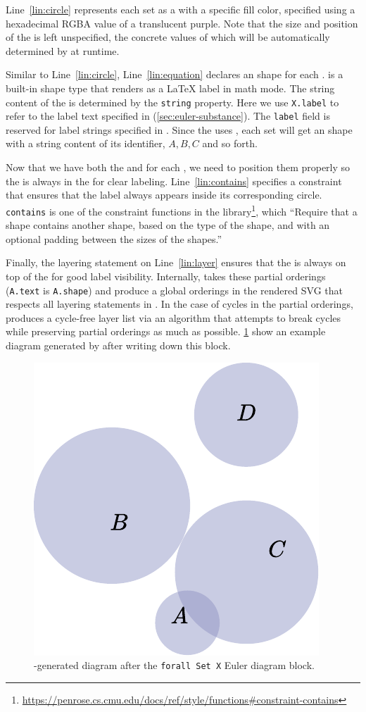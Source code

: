 Line~\ref{lin:circle} represents each set as a  with a specific fill color, specified using a hexadecimal RGBA value of a translucent purple. Note that the size and position of the  is left unspecified, the concrete  values of which will be automatically determined by \Penrose at runtime. 

Similar to Line~\ref{lin:circle}, Line~\ref{lin:equation} declares an  shape for each .  is a built-in shape type that renders as a \LaTeX{} label in math mode. The string content of the  is determined by the \texttt{string} property. Here we use \texttt{X.label} to refer to the label text specified in \Substance (\cref{sec:euler-substance}). The \texttt{label} field is reserved for label strings specified in \Substance. Since the \Substance uses , each set will get an  shape with a string content of its \Substance identifier, $A,B,C$ and so forth.

Now that we have both the  and  for each , we need to position them properly so the  is always in the  for clear labeling. Line~\ref{lin:contains} specifies a constraint that ensures that the label always appears inside its corresponding circle. \texttt{contains} is one of the constraint functions in the \Penrose library\footnote{\url{https://penrose.cs.cmu.edu/docs/ref/style/functions\#constraint-contains}}, which ``Require that a shape contains another shape, based on the type of the shape, and with an optional padding between the sizes of the shapes.''

Finally, the layering statement on Line~\ref{lin:layer} ensures that the  is always on top of the  for good label visibility. Internally, \Penrose takes these partial orderings (\eg \texttt{A.text} is  \texttt{A.shape}) and produce a global orderings in the rendered SVG that respects all layering statements in \Style. In the case of cycles in the partial orderings, \Style produces a cycle-free layer list via an algorithm that attempts to break cycles while preserving partial orderings as much as possible. \cref{fig:euler-partial-1} show an example diagram generated by \Penrose after writing down this \Style block.

\begin{figure}[h!]
    \centering
    \includegraphics[width=.4\linewidth]{assets/appendix/after-set-block.pdf}
    \caption{\Penrose-generated diagram after the \texttt{forall Set X} Euler diagram \Style block.}
    \label{fig:euler-partial-1}
\end{figure}

